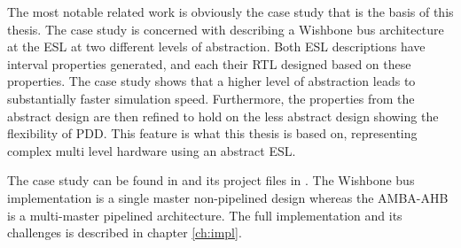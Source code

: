 The most notable related work is obviously the case study that is the basis of this thesis. The case study is concerned with describing a Wishbone bus architecture at the ESL at two different levels of abstraction. Both ESL descriptions have interval properties generated, and each their RTL designed based on these properties. The case study shows that a higher level of abstraction leads to substantially faster simulation speed. Furthermore, the properties from the abstract design are then refined to hold on the less abstract design showing the flexibility of PDD. This feature is what this thesis is based on, representing complex multi level hardware using an abstract ESL.

 The case study can be found in \cite{pddref} and its project files in \cite{descam}. The Wishbone bus implementation is a single master non-pipelined design whereas the AMBA-AHB is a multi-master pipelined architecture. The full implementation and its challenges is described in chapter \ref{ch:impl}.          





 


